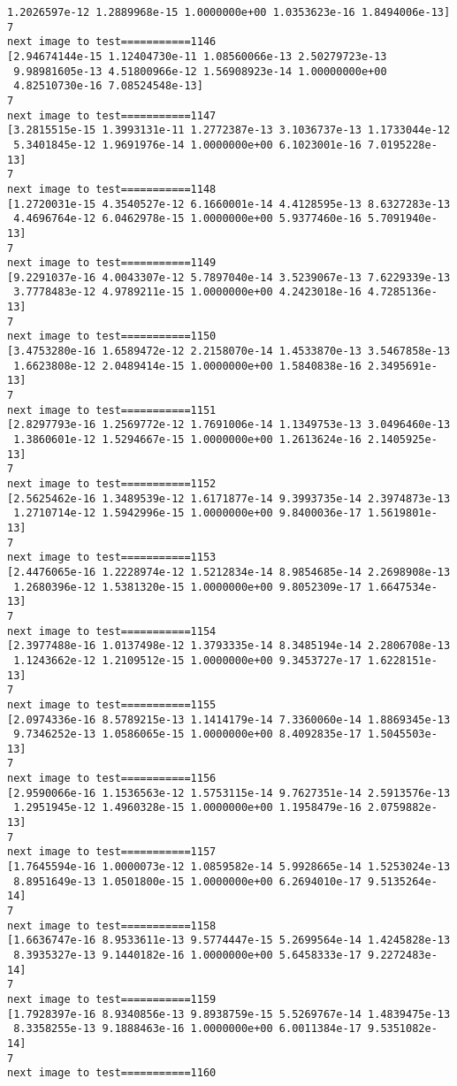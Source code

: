 \documentclass[11pt]{article}
\begin{document}
\begin{Verbatim}[commandchars=\\\{\}]
 1.2026597e-12 1.2889968e-15 1.0000000e+00 1.0353623e-16 1.8494006e-13]
7
next image to test===========1146
[2.94674144e-15 1.12404730e-11 1.08560066e-13 2.50279723e-13
 9.98981605e-13 4.51800966e-12 1.56908923e-14 1.00000000e+00
 4.82510730e-16 7.08524548e-13]
7
next image to test===========1147
[3.2815515e-15 1.3993131e-11 1.2772387e-13 3.1036737e-13 1.1733044e-12
 5.3401845e-12 1.9691976e-14 1.0000000e+00 6.1023001e-16 7.0195228e-13]
7
next image to test===========1148
[1.2720031e-15 4.3540527e-12 6.1660001e-14 4.4128595e-13 8.6327283e-13
 4.4696764e-12 6.0462978e-15 1.0000000e+00 5.9377460e-16 5.7091940e-13]
7
next image to test===========1149
[9.2291037e-16 4.0043307e-12 5.7897040e-14 3.5239067e-13 7.6229339e-13
 3.7778483e-12 4.9789211e-15 1.0000000e+00 4.2423018e-16 4.7285136e-13]
7
next image to test===========1150
[3.4753280e-16 1.6589472e-12 2.2158070e-14 1.4533870e-13 3.5467858e-13
 1.6623808e-12 2.0489414e-15 1.0000000e+00 1.5840838e-16 2.3495691e-13]
7
next image to test===========1151
[2.8297793e-16 1.2569772e-12 1.7691006e-14 1.1349753e-13 3.0496460e-13
 1.3860601e-12 1.5294667e-15 1.0000000e+00 1.2613624e-16 2.1405925e-13]
7
next image to test===========1152
[2.5625462e-16 1.3489539e-12 1.6171877e-14 9.3993735e-14 2.3974873e-13
 1.2710714e-12 1.5942996e-15 1.0000000e+00 9.8400036e-17 1.5619801e-13]
7
next image to test===========1153
[2.4476065e-16 1.2228974e-12 1.5212834e-14 8.9854685e-14 2.2698908e-13
 1.2680396e-12 1.5381320e-15 1.0000000e+00 9.8052309e-17 1.6647534e-13]
7
next image to test===========1154
[2.3977488e-16 1.0137498e-12 1.3793335e-14 8.3485194e-14 2.2806708e-13
 1.1243662e-12 1.2109512e-15 1.0000000e+00 9.3453727e-17 1.6228151e-13]
7
next image to test===========1155
[2.0974336e-16 8.5789215e-13 1.1414179e-14 7.3360060e-14 1.8869345e-13
 9.7346252e-13 1.0586065e-15 1.0000000e+00 8.4092835e-17 1.5045503e-13]
7
next image to test===========1156
[2.9590066e-16 1.1536563e-12 1.5753115e-14 9.7627351e-14 2.5913576e-13
 1.2951945e-12 1.4960328e-15 1.0000000e+00 1.1958479e-16 2.0759882e-13]
7
next image to test===========1157
[1.7645594e-16 1.0000073e-12 1.0859582e-14 5.9928665e-14 1.5253024e-13
 8.8951649e-13 1.0501800e-15 1.0000000e+00 6.2694010e-17 9.5135264e-14]
7
next image to test===========1158
[1.6636747e-16 8.9533611e-13 9.5774447e-15 5.2699564e-14 1.4245828e-13
 8.3935327e-13 9.1440182e-16 1.0000000e+00 5.6458333e-17 9.2272483e-14]
7
next image to test===========1159
[1.7928397e-16 8.9340856e-13 9.8938759e-15 5.5269767e-14 1.4839475e-13
 8.3358255e-13 9.1888463e-16 1.0000000e+00 6.0011384e-17 9.5351082e-14]
7
next image to test===========1160

\end{Verbatim}
\end{document}
